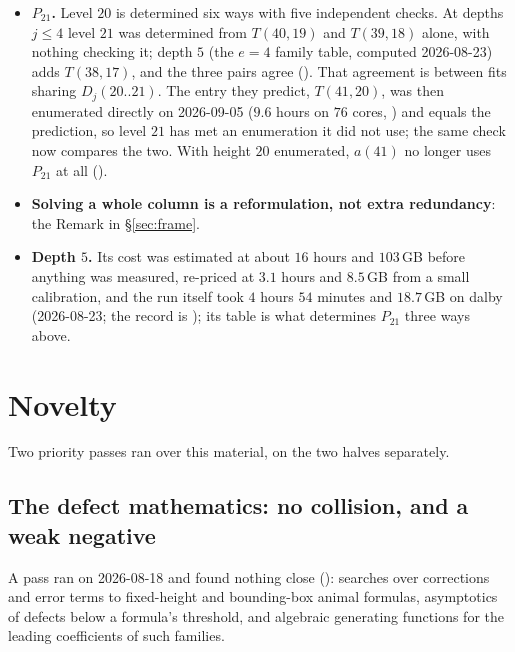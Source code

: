 \documentclass[11pt]{article}
\begin{document}
\begin{itemize}
\item \textbf{$P_{21}$.} Level $20$ is determined six ways with five
independent checks. At depths $j \le 4$ level $21$ was determined from
$T(40,19)$ and $T(39,18)$ alone, with nothing checking it; depth $5$ (the
$e = 4$ family table, computed 2026-08-23) adds $T(38,17)$, and the three pairs
agree (). That agreement is between
fits sharing $D_j(20..21)$. The entry they predict, $T(41,20)$, was then
enumerated directly on 2026-09-05 ($9.6$ hours on $76$ cores,
) and equals the prediction, so level $21$ has met an
enumeration it did not use; the same check now compares the two. With height
$20$ enumerated, $a(41)$ no longer uses $P_{21}$ at all
().

\item \textbf{Solving a whole column is a reformulation, not extra
redundancy}: the Remark in \S\ref{sec:frame}.

\item \textbf{Depth $5$.} Its cost was estimated at about $16$ hours and
$103$\,GB before anything was measured, re-priced at $3.1$ hours and
$8.5$\,GB from a small calibration, and the run itself took $4$ hours
$54$ minutes and $18.7$\,GB on dalby (2026-08-23; the record is
); its table is what determines $P_{21}$ three
ways above.
\end{itemize}

\section{Novelty}
\label{sec:novelty}

Two priority passes ran over this material, on the two halves separately.

\subsection{The defect mathematics: no collision, and a weak negative}


A pass ran on 2026-08-18 and found nothing close
(): searches over corrections and error
terms to fixed-height and bounding-box animal formulas, asymptotics of defects
below a formula's threshold, and algebraic generating functions for the leading
coefficients of such families.
\end{document}
